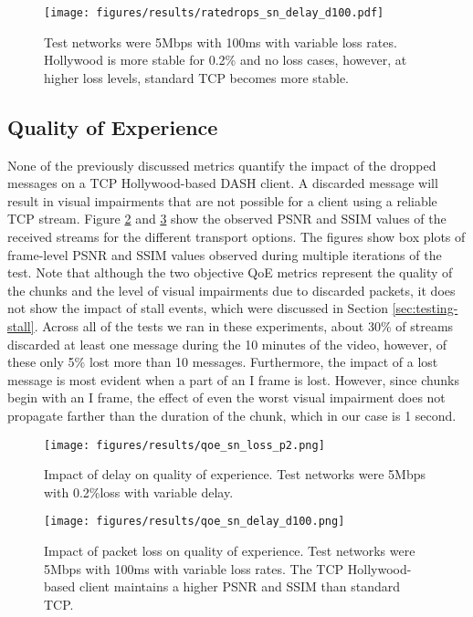 \begin{figure}
  \centering
  \texttt{[image: figures/results/ratedrops\_sn\_delay\_d100.pdf]}
  \caption{Test networks were 5Mbps with 100ms with variable loss rates. Hollywood is more 
           stable for 0.2\% and no loss cases, however, at higher loss levels, standard TCP 
           becomes more stable.}
  \label{fig:ratechange_loss}
\end{figure}

\subsection{Quality of Experience}
None of the previously discussed metrics quantify the impact of the dropped messages
on a TCP Hollywood-based DASH client. A discarded message will result in visual impairments
that are not possible for a client using a reliable TCP stream. Figure \ref{fig:qoe_delay2} 
and \ref{fig:qoe_loss} show the observed PSNR and SSIM values of the received streams for the 
different transport options. The figures show box plots of frame-level PSNR and SSIM values 
observed during multiple
iterations of the test. Note that although the two objective QoE metrics represent the
quality of the chunks and the level of visual impairments due to discarded packets, it
does not show the impact of stall events, which were discussed in
Section \ref{sec:testing-stall}. Across all of the tests we ran in these experiments,
about 30\% of streams discarded at least one message during the 10 minutes of the video,
however, of these only 5\% lost more than 10 messages. Furthermore, the impact of a lost
message is most evident when a part of an I frame is lost. However, since chunks begin with
an I frame, the effect of even the worst visual impairment does not propagate farther than
the duration of the chunk, which in our case is 1 second.

\begin{figure}
  \centering
  \texttt{[image: figures/results/qoe\_sn\_loss\_p2.png]}
  \caption{Impact of delay on quality of experience. Test networks were 5Mbps with 0.2\%loss 
           with variable delay.}
  \label{fig:qoe_delay2}
\end{figure}

\begin{figure}
  \centering
  \texttt{[image: figures/results/qoe\_sn\_delay\_d100.png]}
  \caption{Impact of packet loss on quality of experience. Test networks were 5Mbps with 100ms 
           with variable loss rates.  The TCP Hollywood-based client maintains a higher PSNR 
           and SSIM than standard TCP.}
  \label{fig:qoe_loss}
\end{figure}

